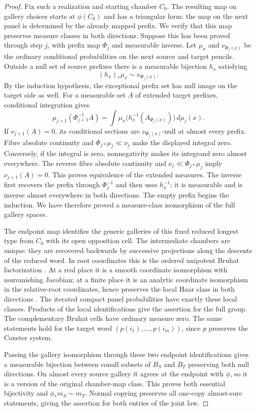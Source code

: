 \begin{proof}
Fix such a realization and starting chamber
$C_0$.  The resulting map on gallery choices
starts at $\phi(C_0)$ and has a triangular
form: the map on the next panel is determined
by the already mapped prefix.  We verify
that this map preserves measure classes in
both directions.  Suppose this has been
proved through step $j$, with prefix map
$\Phi_j$ and measurable inverse.  Let
$\mu_x$ and $\nu_{\Phi_j(x)}$ be the ordinary
conditional probabilities on the next
source and target pencils.  Outside a
null set of source prefixes there is a
measurable bijection $h_x$ satisfying
\[
 (h_x)_*\mu_x\sim\nu_{\Phi_j(x)}.
\]
By the induction hypothesis, the exceptional
prefix set has null image on the target
side as well.  For a measurable set $A$
of extended target prefixes, conditional
integration gives
\[
 \mu_{j+1}(\Phi_{j+1}^{-1}A)
   =\int \mu_x
       \bigl(h_x^{-1}(A_{\Phi_j(x)})\bigr)
       \,d\mu_j(x).
\]
If $\nu_{j+1}(A)=0$, its conditional sections
are $\nu_{\Phi_j(x)}$-null at almost every
prefix.  Fibre absolute continuity and
$\Phi_{j*}\mu_j\ll\nu_j$ make the displayed
integral zero.  Conversely, if the integral
is zero, nonnegativity makes its integrand
zero almost everywhere.  The reverse fibre
absolute continuity and
$\nu_j\ll\Phi_{j*}\mu_j$ imply
$\nu_{j+1}(A)=0$.  This proves equivalence
of the extended measures.  The inverse
first recovers the prefix through
$\Phi_j^{-1}$ and then uses $h_x^{-1}$;
it is measurable and is inverse almost
everywhere in both directions.  The empty
prefix begins the induction.  We have
therefore proved a measure-class
isomorphism of the full gallery spaces.

The endpoint map identifies the generic
galleries of this fixed reduced longest
type from $C_0$ with its open opposition
cell.  The intermediate chambers are
unique: they are recovered backwards by
successive projections along the descents
of the reduced word.  In root coordinates
this is the ordered unipotent Bruhat
factorization \cite{Borel1991,Tits1964}.
At a real place it is a
smooth coordinate isomorphism with
nonvanishing Jacobian; at a finite place
it is an analytic coordinate isomorphism
in the relative-root coordinates, hence
preserves the local Haar class in both
directions \cite{BruhatTits1972,BruhatTits1984}.
The iterated compact panel
probabilities have exactly these local
classes.  Products of the local
identifications give the assertion for
the full group.  The complementary
Bruhat cells have ordinary measure zero.
The same statements hold for the target
word $(p(i_1),\ldots,p(i_m))$, since $p$
preserves the Coxeter system.

Passing the gallery isomorphism through
these two endpoint identifications gives
a measurable bijection between conull
subsets of $B_S$ and $B_T$ preserving
both null directions.  On almost every
source gallery it agrees at the endpoint
with $\phi$, so it is a version of the
original chamber-map class.  This proves
both essential bijectivity and
$\phi_*m_S\sim m_T$.  Normal copying
preserves all one-copy almost-sure
statements, giving the assertion for
both entries of the joint law.
\end{proof}
